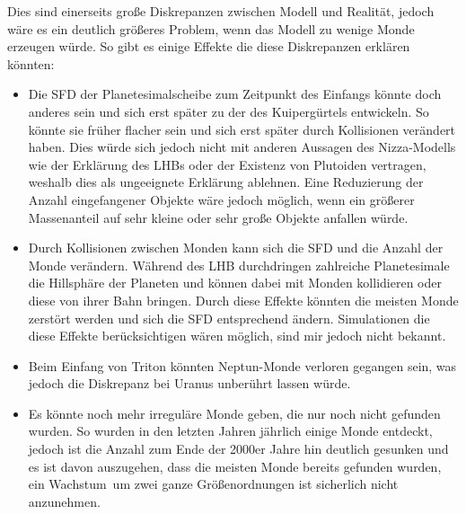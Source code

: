 \documentclass[12pt,a4paper,twoside]{article}
\renewcommand{\cite}{\citep}
\begin{document}
Dies sind einerseits große Diskrepanzen zwischen Modell und Realität, jedoch wäre es ein deutlich größeres Problem, wenn das Modell zu wenige Monde erzeugen würde. So gibt es einige Effekte die diese Diskrepanzen erklären könnten:
\begin{itemize}
\item Die SFD der Planetesimalscheibe zum Zeitpunkt des Einfangs könnte doch anderes sein und sich erst später zu der des Kuipergürtels entwickeln.
So könnte sie früher flacher sein und sich erst später durch Kollisionen verändert haben. Dies würde sich jedoch nicht mit anderen Aussagen des Nizza-Modells wie der Erklärung des LHBs oder der Existenz von Plutoiden vertragen, %
weshalb \cite{Nesvorny2007} dies als ungeeignete Erklärung ablehnen.
Eine Reduzierung der Anzahl eingefangener Objekte wäre jedoch möglich, wenn ein größerer Massenanteil auf sehr kleine oder sehr große Objekte anfallen würde\cite{Nesvorny2007}. %
\item Durch Kollisionen zwischen Monden kann sich die SFD und die Anzahl der Monde verändern. Während des LHB durchdringen zahlreiche Planetesimale die Hillsphäre der Planeten und können dabei mit Monden kollidieren oder diese von ihrer Bahn bringen\cite{Nesvorny2007}. Durch diese Effekte könnten die meisten Monde zerstört werden und sich die SFD entsprechend ändern. Simulationen die diese Effekte berücksichtigen wären möglich, sind mir jedoch nicht bekannt. %
\item Beim Einfang von Triton könnten Neptun-Monde verloren gegangen sein, was jedoch die Diskrepanz bei Uranus unberührt lassen würde\cite{Nesvorny2007}. %
\item Es könnte noch mehr irreguläre Monde geben, die nur noch nicht gefunden wurden. So wurden in den letzten Jahren jährlich einige Monde entdeckt, jedoch ist die Anzahl zum Ende der 2000er Jahre hin deutlich gesunken und es ist davon auszugehen, dass die meisten Monde bereits gefunden wurden, ein \glqq Wachstum\grqq\ um zwei ganze Größenordnungen ist sicherlich nicht anzunehmen.
\end{itemize}
\end{document}
